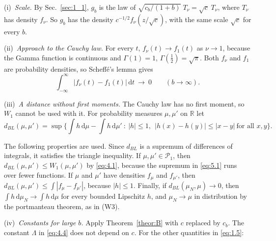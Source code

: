\documentclass[aip,jmp,preprint,onecolumn,floatfix,superscriptaddress,nofootinbib,11pt]{revtex4-2}
\theoremstyle{plain}
\theoremstyle{remark}
\numberwithin{equation}{section}
\newcommand{\dd}{\mathrm{d}}
\begin{document}
(i)~\textit{Scale.} By Sec.~\ref{sec:1_1}, $g_b$ is the law of $\sqrt{c_b/(1+b)}\;T_\nu=\sqrt c\;T_\nu$, where $T_\nu$ has density $f_\nu$. So $g_b$ has the density $c^{-1/2}f_\nu(z/\sqrt c)$, with the same scale $\sqrt c$ for every $b$.
 
(ii)~\textit{Approach to the Cauchy law.} For every $t$, $f_\nu(t)\to f_1(t)$ as $\nu\to1$, because the Gamma function is continuous and $\Gamma(1)=1$, $\Gamma(\tfrac12)=\sqrt\pi$. Both $f_\nu$ and $f_1$ are probability densities, so Scheff\'e's lemma gives
%
\begin{equation}
\int_{-\infty}^{\infty}\big|f_\nu(t)-f_1(t)\big|\,\dd t\ \longrightarrow\ 0\qquad(b\to\infty).
\label{eq:scheffe}
\end{equation}
%

(iii)~\textit{A distance without first moments.} The Cauchy law has no first moment, so $W_1$ cannot be used with it. For probability measures $\mu,\mu'$ on $\mathbb R$ let
%
\begin{equation}
d_{BL}(\mu,\mu')=\sup\Big\{\int h\,\dd\mu-\int h\,\dd\mu'\ :\ |h|\le1,\ \ |h(x)-h(y)|\le|x-y|\ \text{for all }x,y\Big\}.
\label{eq:5.1}
\end{equation}
 
The following properties are used. Since $d_{BL}$ is a supremum of differences of integrals, it satisfies the triangle inequality. If $\mu,\mu'\in\mathcal P_1$, then $d_{BL}(\mu,\mu')\le W_1(\mu,\mu')$ by \eqref{eq:4.1}, because the supremum in \eqref{eq:5.1} runs over fewer functions. If $\mu$ and $\mu'$ have densities $f_\mu$ and $f_{\mu'}$, then $d_{BL}(\mu,\mu')\le\int|f_\mu-f_{\mu'}|$, because $|h|\le1$. Finally, if $d_{BL}(\mu_N,\mu)\to0$, then $\int h\,\dd\mu_N\to\int h\,\dd\mu$ for every bounded Lipschitz $h$, and $\mu_N\to\mu$ in distribution by the portmanteau theorem, as in (W3).
 
(iv)~\textit{Constants for large $b$.} Apply Theorem~\ref{theor:B} with $c$ replaced by $c_b$. The constant $\Lambda$ in \eqref{eq:4.4} does not depend on $c$. For the other quantities in \eqref{eq:1.5}:
 
\end{document}
